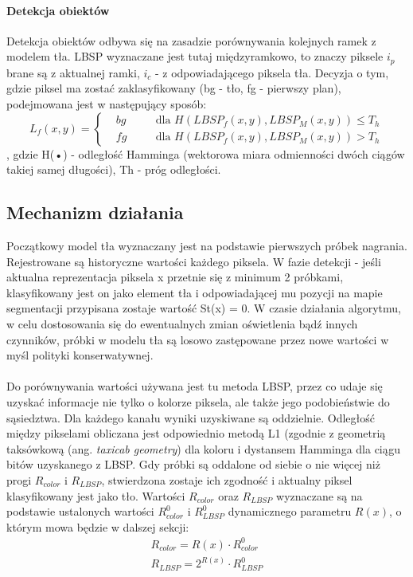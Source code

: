 \paragraph{Detekcja obiektów \\}
Detekcja obiektów odbywa się na zasadzie porównywania kolejnych ramek z modelem tła. LBSP wyznaczane jest tutaj międzyramkowo, to znaczy piksele $i_{p}$ brane są z aktualnej ramki, $i_{c}$ - z odpowiadającego piksela tła. Decyzja o tym, gdzie piksel ma zostać zaklasyfikowany (bg - tło, fg - pierwszy plan), podejmowana jest w następujący sposób:
\begin{equation}
L_{f}(x,y)=\left\{
\begin{split}
&bg & \quad &\text{dla $H(LBSP_{f}(x,y),LBSP_{M}(x,y))\leq T_{h}$} \\
&fg & \quad &\text{dla $H(LBSP_{f}(x,y),LBSP_{M}(x,y))>T_{h}$}
\end{split}
\right.
\end{equation}
, gdzie H(•) - odległość Hamminga (wektorowa miara odmienności dwóch ciągów takiej samej długości), Th - próg odległości.
\subsection{Mechanizm działania}
Początkowy model tła wyznaczany jest na podstawie pierwszych próbek nagrania. Rejestrowane są historyczne wartości każdego piksela. W fazie detekcji - jeśli aktualna reprezentacja piksela x przetnie się z minimum 2 próbkami, klasyfikowany jest on jako element tła i odpowiadającej mu pozycji na mapie segmentacji przypisana zostaje wartość St(x) = 0. W czasie działania algorytmu, w celu dostosowania się do ewentualnych zmian oświetlenia bądź innych czynników, próbki w modelu tła są losowo zastępowane przez nowe wartości w myśl polityki konserwatywnej.
\paragraph{}
Do porównywania wartości używana jest tu metoda LBSP, przez co udaje się uzyskać informacje nie tylko o kolorze piksela, ale także jego podobieństwie do sąsiedztwa. Dla każdego kanału wyniki uzyskiwane są oddzielnie. Odległość między pikselami obliczana jest odpowiednio metodą L1 (zgodnie z geometrią taksówkową (ang. \textit{taxicab geometry}) dla koloru i dystansem Hamminga dla ciągu bitów uzyskanego z LBSP. Gdy próbki są oddalone od siebie o nie więcej niż progi $R_{color}$ i $R_{LBSP}$, stwierdzona zostaje ich zgodność i aktualny piksel klasyfikowany jest jako tło. Wartości $R_{color}$ oraz $R_{LBSP}$ wyznaczane są na podstawie ustalonych wartości $R_{color}^{0}$ i $R_{LBSP}^{0}$ dynamicznego parametru $R(x)$, o którym mowa będzie w dalszej sekcji:
\begin{gather}
R_{color} = R(x)\cdot R_{color}^{0} \\
R_{LBSP} = 2^{R(x)}\cdot R_{LBSP}^{0}
\end{gather}
